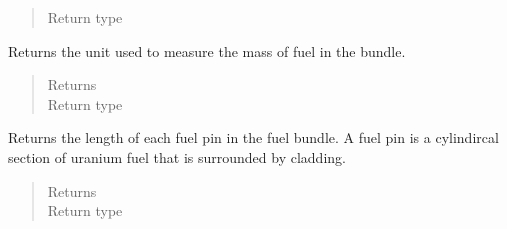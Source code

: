 \documentclass[letterpaper,10pt,openany,oneside,english]{sphinxmanual}
\begin{document}
\begin{fulllineitems}
\begin{fulllineitems}
\begin{quote}
\begin{description}
\item[{Return type}] \leavevmode
{}

\end{description}\end{quote}

\end{fulllineitems}


\begin{fulllineitems}
\label{\detokenize{support_rst/fuel_bundle:fuel_bundle.FuelBundle.fuel_mass_unit}}
Returns the unit used to measure the mass of fuel in the bundle.
\begin{quote}\begin{description}
\item[{Returns}] \leavevmode
{}

\item[{Return type}] \leavevmode
{}

\end{description}\end{quote}

\end{fulllineitems}


\begin{fulllineitems}
\label{\detokenize{support_rst/fuel_bundle:fuel_bundle.FuelBundle.fuel_pin_length}}
Returns the length of each fuel pin in the fuel bundle. A fuel pin is
a cylindircal section of uranium fuel that is surrounded by cladding.
\begin{quote}\begin{description}
\item[{Returns}] \leavevmode
{}

\item[{Return type}] \leavevmode
{}

\end{description}\end{quote}

\end{fulllineitems}


\end{fulllineitems}
\end{document}
